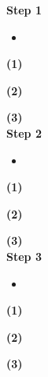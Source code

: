 \documentclass[../main.tex]{subfiles}
\begin{document}
\noindent \textbf{Step 1 }
\begin{itemize}
\item \textbf{}
\end{itemize}
\par \textbf{(1) }
\par \textbf{(2) }
\par \textbf{(3) }
\\
\noindent \textbf{Step 2 }
\begin{itemize}
\item \textbf{}
\end{itemize}
\par \textbf{(1) }
\par \textbf{(2) }
\par \textbf{(3) }
\\
\noindent \textbf{Step 3 }
\begin{itemize}
\item \textbf{}
\end{itemize}
\par \textbf{(1) }
\par \textbf{(2) }
\par \textbf{(3) }
   

  
\end{document}
